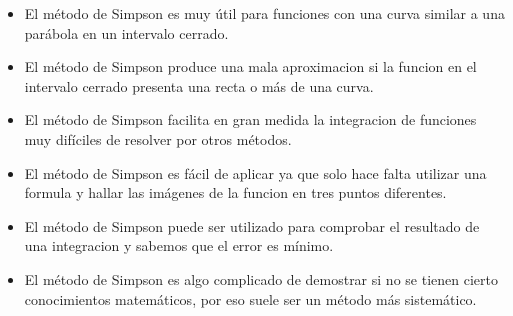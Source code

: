 
\begin{itemize}

	\item El método de Simpson es muy útil para funciones con una curva similar a una parábola en un intervalo cerrado.

	\item El método de Simpson produce una mala aproximacion si la funcion en el intervalo cerrado presenta una recta o más de una curva.
	
	\item El método de Simpson facilita en gran medida la integracion de funciones muy difíciles de resolver por otros métodos.

	\item El método de Simpson es fácil de aplicar ya que solo hace falta utilizar una formula y hallar las imágenes de la funcion en tres puntos diferentes.
	
	\item El método de Simpson puede ser utilizado para comprobar el resultado de una integracion y sabemos que el error es mínimo.
	
	\item El método de Simpson es algo complicado de demostrar si no se tienen cierto conocimientos matemáticos, por eso suele ser un método más sistemático.

\end{itemize}
